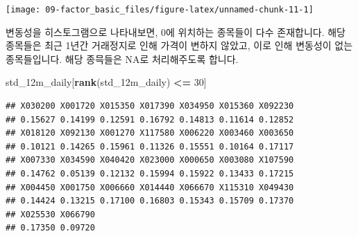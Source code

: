 \documentclass[12pt,]{book}
\newenvironment{Shaded}{\begin{snugshade}}{\end{snugshade}}
\newcommand{\DataTypeTok}[1]{\textcolor[rgb]{0.13,0.29,0.53}{#1}}
\newcommand{\DecValTok}[1]{\textcolor[rgb]{0.00,0.00,0.81}{#1}}
\newcommand{\FloatTok}[1]{\textcolor[rgb]{0.00,0.00,0.81}{#1}}
\newcommand{\KeywordTok}[1]{\textcolor[rgb]{0.13,0.29,0.53}{\textbf{#1}}}
\newcommand{\NormalTok}[1]{#1}
\newcommand{\OperatorTok}[1]{\textcolor[rgb]{0.81,0.36,0.00}{\textbf{#1}}}
\newcommand{\OtherTok}[1]{\textcolor[rgb]{0.56,0.35,0.01}{#1}}
\newcommand{\StringTok}[1]{\textcolor[rgb]{0.31,0.60,0.02}{#1}}
\begin{document}
\begin{Shaded}
\end{Shaded}

\begin{center}\texttt{[image: 09-factor\_basic\_files/figure-latex/unnamed-chunk-11-1]} \end{center}

변동성을 히스토그램으로 나타내보면, 0에 위치하는 종목들이 다수 존재합니다. 해당 종목들은 최근 1년간 거래정지로 인해 가격이 변하지 않았고, 이로 인해 변동성이 없는 종목들입니다. 해당 종믁들은 NA로 처리해주도록 합니다.

\begin{Shaded}
\begin{Highlighting}[]
\NormalTok{std_12m_daily[}\KeywordTok{rank}\NormalTok{(std_12m_daily) }\OperatorTok{<=}\StringTok{ }\DecValTok{30}\NormalTok{]}
\end{Highlighting}
\end{Shaded}

\begin{verbatim}
## X030200 X001720 X015350 X017390 X034950 X015360 X092230 
## 0.15627 0.14199 0.12591 0.16792 0.14813 0.11614 0.12852 
## X018120 X092130 X001270 X117580 X006220 X003460 X003650 
## 0.10121 0.14265 0.15961 0.11326 0.15551 0.10164 0.17117 
## X007330 X034590 X040420 X023000 X000650 X003080 X107590 
## 0.14762 0.05139 0.12132 0.15994 0.15922 0.13433 0.17215 
## X004450 X001750 X006660 X014440 X066670 X115310 X049430 
## 0.14424 0.13215 0.17100 0.16803 0.15343 0.15709 0.17370 
## X025530 X066790 
## 0.17350 0.09720
\end{verbatim}
\end{document}
